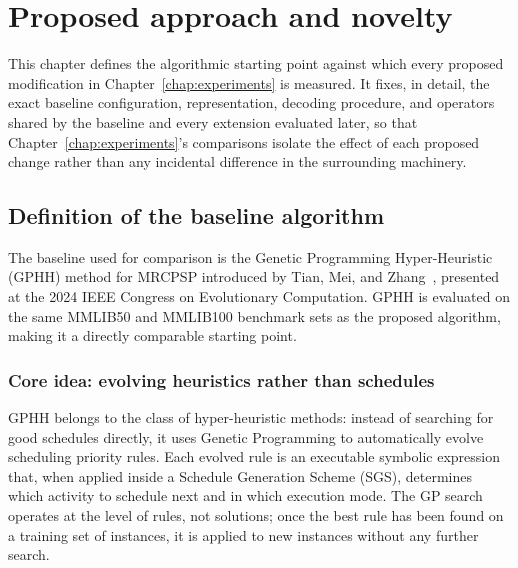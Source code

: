 \chapter{Proposed approach and novelty}
\label{chap:approach}

This chapter defines the algorithmic starting point against which every
proposed modification in Chapter~\ref{chap:experiments} is measured. It
fixes, in detail, the exact baseline configuration, representation,
decoding procedure, and operators shared by the baseline and every
extension evaluated later, so that Chapter~\ref{chap:experiments}'s
comparisons isolate the effect of each proposed change rather than any
incidental difference in the surrounding machinery.

\section{Definition of the baseline algorithm}
\label{sec:baseline-definition}

The baseline used for comparison is the Genetic Programming Hyper-Heuristic
(GPHH) method for MRCPSP introduced by Tian, Mei, and Zhang~\cite{Tian2024GPHH},
presented at the 2024 IEEE Congress on Evolutionary Computation.  GPHH is
evaluated on the same MMLIB50 and MMLIB100 benchmark sets as the proposed
algorithm, making it a directly comparable starting point.

\subsection{Core idea: evolving heuristics rather than schedules}

GPHH belongs to the class of hyper-heuristic methods: instead of searching for good schedules directly, it uses Genetic Programming to automatically evolve scheduling priority rules.
Each evolved rule is an executable symbolic expression that, when applied inside a Schedule Generation Scheme (SGS), determines which activity to schedule next and in which execution mode.
The GP search operates at the level of rules, not solutions; once the best rule has been found on a training set of instances, it is applied to new instances without any further search.

